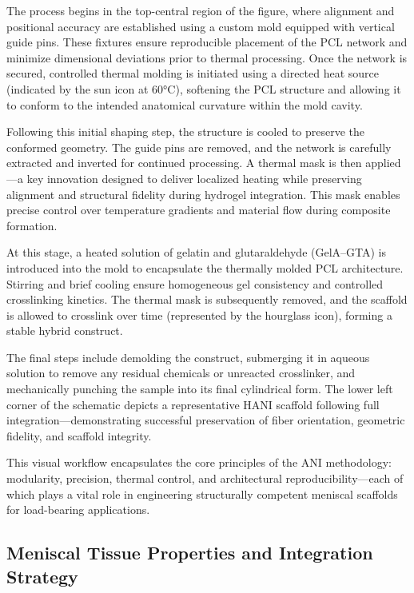 The process begins in the top-central region of the figure, where alignment and positional accuracy are established using a custom mold equipped with vertical guide pins. These fixtures ensure reproducible placement of the PCL network and minimize dimensional deviations prior to thermal processing. Once the network is secured, controlled thermal molding is initiated using a directed heat source (indicated by the sun icon at 60°C), softening the PCL structure and allowing it to conform to the intended anatomical curvature within the mold cavity.

Following this initial shaping step, the structure is cooled to preserve the conformed geometry. The guide pins are removed, and the network is carefully extracted and inverted for continued processing. A thermal mask is then applied—a key innovation designed to deliver localized heating while preserving alignment and structural fidelity during hydrogel integration. This mask enables precise control over temperature gradients and material flow during composite formation.

At this stage, a heated solution of gelatin and glutaraldehyde (GelA–GTA) is introduced into the mold to encapsulate the thermally molded PCL architecture. Stirring and brief cooling ensure homogeneous gel consistency and controlled crosslinking kinetics. The thermal mask is subsequently removed, and the scaffold is allowed to crosslink over time (represented by the hourglass icon), forming a stable hybrid construct.

The final steps include demolding the construct, submerging it in aqueous solution to remove any residual chemicals or unreacted crosslinker, and mechanically punching the sample into its final cylindrical form. The lower left corner of the schematic depicts a representative HANI scaffold following full integration—demonstrating successful preservation of fiber orientation, geometric fidelity, and scaffold integrity.

This visual workflow encapsulates the core principles of the ANI methodology: modularity, precision, thermal control, and architectural reproducibility—each of which plays a vital role in engineering structurally competent meniscal scaffolds for load-bearing applications.

\subsection{Meniscal Tissue Properties and Integration Strategy}

